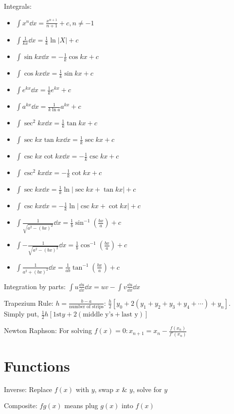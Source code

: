 \documentclass[10pt,a4paper,oneside]{book}
\begin{document}
Integrals:
\begin{itemize}
    \item $\int x^n \dd x = \frac{x^{n+1}}{n+1}+c, n\neq -1$
    \item $\int \frac{1}{kx}\dd x = \frac{1}{k}\ln |X| + c$
    \item $\int \sin kx \dd x = -\frac{1}{k}\cos kx + c$
    \item $\int \cos kx \dd x = \frac{1}{k}\sin kx + c$
    \item $\int e^{kx}\dd x = \frac{1}{k}e^{kx}+c$
    \item $\int a^{kx}\dd x = \frac{1}{k\ln a}a^{kx}+c$
    \item $\int\sec^2 kx \dd x = \frac{1}{k}\tan kx + c$
    \item $\int \sec kx \tan kx \dd x = \frac{1}{k}\sec kx +c$
    \item $\int \csc kx \cot kx \dd x = -\frac{1}{k}\csc kx +c$
    \item $\int \csc^2 kx \dd x = -\frac{1}{k}\cot kx + c$
    \item $\int \sec kx \dd x = \frac{1}{k}\ln|\sec kx + \tan kx|+c$
    \item $\int \csc kx \dd x = -\frac{1}{k}\ln |\csc kx + \cot kx|+c$
    \item $\int \frac{1}{\sqrt{a^2-(bx)^2}}\dd x = \frac{1}{b}\sin^{-1}\left(\frac{bx}{a}\right)+c$
    \item $\int -\frac{1}{\sqrt{a^2-(bx)^2}}\dd x = \frac{1}{b}\cos^{-1}\left(\frac{bx}{a}\right)+c$
    \item $\int \frac{1}{a^2+(bx)^2}\dd x = \frac{1}{ab}\tan^{-1}\left(\frac{bx}{a}\right)+c$
\end{itemize}

Integration by parts: $\int u \frac{\dd u}{\dd x}\dd x = uv-\int v\frac{\dd u}{\dd x}\dd x$

Trapezium Rule: $h=\frac{b-a}{\text{number of strips}}$: $\frac{h}{2}[y_0+2(y_1+y_2+y_3+y_4+\cdots)+y_n]$. Simply put, $\frac{1}{2}h[\text{1st}y + 2(\text{middle y's}+\text{last y})]$

Newton Raphson: For solving $f(x)=0: x_{n+1}=x_n-\frac{f(x_n)}{f'(x_n)}$

\section*{Functions}
Inverse: Replace $f(x)$ with $y$, swap $x$ \& $y$, solve for $y$

Composite: $fg(x)$ means plug $g(x)$ into $f(x)$
\end{document}

